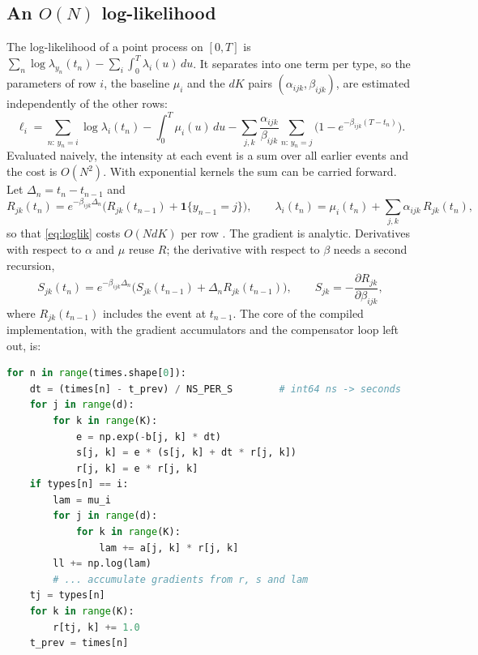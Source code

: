 \documentclass[a4paper,11pt]{article}
\begin{document}
\subsection{An \texorpdfstring{$O(N)$}{O(N)} log-likelihood}

The log-likelihood of a point process on $[0, T]$ is $\sum_n \log \lambda_{y_n}(t_n) - \sum_i \int_0^T \lambda_i(u)\, du$. It separates into one term per type, so the parameters of row $i$, the baseline $\mu_i$ and the $dK$ pairs $(\alpha_{ijk}, \beta_{ijk})$, are estimated independently of the other rows:
\begin{equation}\label{eq:loglik}
\ell_i = \sum_{n:\, y_n = i} \log \lambda_i(t_n) - \int_0^T \mu_i(u)\, du - \sum_{j, k} \frac{\alpha_{ijk}}{\beta_{ijk}} \sum_{n:\, y_n = j} \Big( 1 - e^{-\beta_{ijk}(T - t_n)} \Big).
\end{equation}
Evaluated naively, the intensity at each event is a sum over all earlier events and the cost is $O(N^2)$. With exponential kernels the sum can be carried forward. Let $\Delta_n = t_n - t_{n-1}$ and
\begin{equation}\label{eq:recursion}
R_{jk}(t_n) = e^{-\beta_{ijk}\Delta_n}\big( R_{jk}(t_{n-1}) + \mathbf{1}\{y_{n-1} = j\} \big), \qquad \lambda_i(t_n) = \mu_i(t_n) + \sum_{j,k} \alpha_{ijk}\, R_{jk}(t_n),
\end{equation}
so that \eqref{eq:loglik} costs $O(NdK)$ per row \cite{laub2015}. The gradient is analytic. Derivatives with respect to $\alpha$ and $\mu$ reuse $R$; the derivative with respect to $\beta$ needs a second recursion,
\begin{equation}\label{eq:S}
S_{jk}(t_n) = e^{-\beta_{ijk}\Delta_n}\big( S_{jk}(t_{n-1}) + \Delta_n R_{jk}(t_{n-1}) \big), \qquad S_{jk} = -\frac{\partial R_{jk}}{\partial \beta_{ijk}},
\end{equation}
where $R_{jk}(t_{n-1})$ includes the event at $t_{n-1}$. The core of the compiled implementation, with the gradient accumulators and the compensator loop left out, is:

\begin{lstlisting}[language=Python]
for n in range(times.shape[0]):
    dt = (times[n] - t_prev) / NS_PER_S        # int64 ns -> seconds
    for j in range(d):
        for k in range(K):
            e = np.exp(-b[j, k] * dt)
            s[j, k] = e * (s[j, k] + dt * r[j, k])
            r[j, k] = e * r[j, k]
    if types[n] == i:
        lam = mu_i
        for j in range(d):
            for k in range(K):
                lam += a[j, k] * r[j, k]
        ll += np.log(lam)
        # ... accumulate gradients from r, s and lam
    tj = types[n]
    for k in range(K):
        r[tj, k] += 1.0
    t_prev = times[n]
\end{lstlisting}
\end{document}
